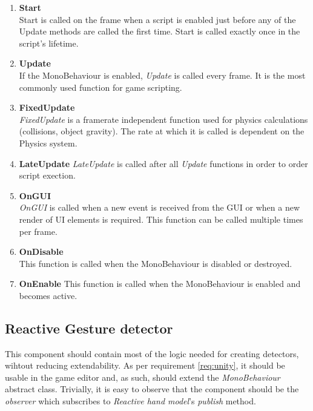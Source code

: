 \documentclass[12pt,a4paper,twoside]{report}
\begin{document}
\begin{enumerate}
  \item \textbf{Start} \\
    Start is called on the frame when a script is enabled just before any of the Update methods are called the first time. Start is called exactly once in the script's lifetime.
    
  \item \textbf{Update} \\
    If the MonoBehaviour is enabled, \textit{Update} is called every frame. It is the most commonly used function for game scripting.
    
  \item \textbf{FixedUpdate} \\
    \textit{FixedUpdate} is a framerate independent function used for physics calculations (collisions, object gravity). The rate at which it is called is dependent on the Physics system.
    
  \item \textbf{LateUpdate}
    \textit{LateUpdate} is called after all \textit{Update} functions in order to order script exection.

  \item \textbf{OnGUI} \\
    \textit{OnGUI} is called when a new event is received from the GUI or when a new render of UI elements is required. This function can be called multiple times per frame.

  \item \textbf{OnDisable} \\
    This function is called when the MonoBehaviour is disabled or destroyed.

  \item \textbf{OnEnable}
    This function is called when the MonoBehaviour is enabled and becomes active.

\end{enumerate}

\subsection{Reactive Gesture detector}
This component should contain most of the logic needed for creating detectors, wihtout reducing extendability. As per requirement \ref{req:unity}, it should be usable in the game editor and, as such, should extend the \textit{MonoBehaviour} abstract class. Trivially, it is easy to observe that the component should be the \textit{observer} which subscribes to \textit{Reactive hand model}'s \textit{publish} method.
\end{document}
